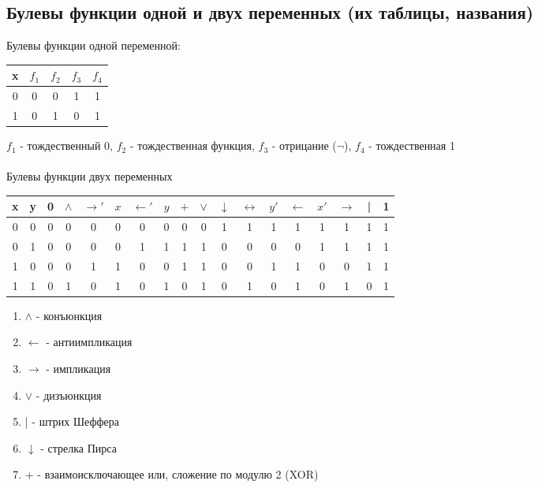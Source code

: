 \documentclass[a4paper]{article}
\theoremstyle{definition}
\theoremstyle{remark}
\begin{document}
    \subsection{Булевы функции одной и двух переменных (их таблицы, названия)}
Булевы функции одной переменной:
         \begin{tabular}{c|cccc}
        x & $f_1$ & $f_2$ & $f_3$ & $f_4$ \\
        \hline
        0 & 0 & 0 & 1 & 1 \\
        1 & 0 & 1 & 0 & 1 \\ 
        \end{tabular}
    $f_1$ - тождественный 0, $f_2$ - тождественная функция, $f_3$ - отрицание ($\neg$), $f_4$ - тождественная 1
\\ \\
    Булевы функции двух переменных
    \begin{tabular}{cc|cccccccccccccccc}
        x & y & 0 & $\wedge$ & $\rightarrow '$ & $x$ & $\leftarrow '$ & $y$ & $+$ & $\vee$ & $\downarrow$ & $\leftrightarrow$ & $y'$ & $\leftarrow$ & $x'$ & $\rightarrow$ & | & 1\\
        \hline
        0 & 0 & 0 & 0 & 0 & 0 & 0 & 0 & 0 & 0 & 1 & 1 & 1 & 1 & 1 & 1 & 1 & 1 \\
        0 & 1 & 0 & 0 & 0 & 0 & 1 & 1 & 1 & 1 & 0 & 0 & 0 & 0 & 1 & 1 & 1 & 1 \\ 
        1 & 0 & 0 & 0 & 1 & 1 & 0 & 0 & 1 & 1 & 0 & 0 & 1 & 1 & 0 & 0 & 1 & 1 \\
        1 & 1 & 0 & 1 & 0 & 1 & 0 & 1 & 0 & 1 & 0 & 1 & 0 & 1 & 0 & 1 & 0 & 1 \\
        \end{tabular}
    \begin{enumerate}
        \item $\wedge$ - конъюнкция
        \item $\leftarrow$ -  антиимпликация
        \item $\rightarrow$ - импликация
        \item $\vee$ - дизъюнкция
        \item | - штрих Шеффера
        \item $\downarrow$ - стрелка Пирса
        \item + -  взаимоисключающее или, сложение по модулю 2 (XOR)
    \end{enumerate}
\end{document}
